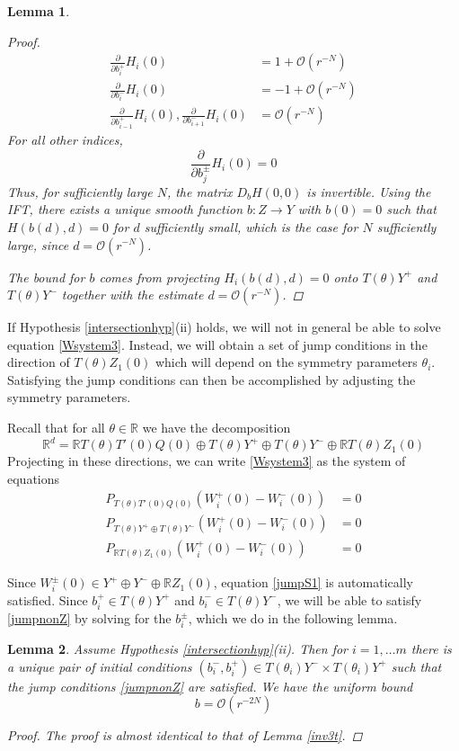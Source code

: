 \documentclass[12pt]{article}
\def\R{{\mathbb R}}
\newtheorem{lemma}{Lemma}
\begin{document}
\begin{lemma}
\begin{proof}
\begin{align*}
\frac{\partial}{\partial b_i^+}H_i(0) &= 1 + \mathcal{O}(r^{-N})  \\
\frac{\partial}{\partial b_i^-}H_i(0) &= -1 + \mathcal{O}(r^{-N}) \\
\frac{\partial}{\partial b_{i-1}^+}H_i(0),
\frac{\partial}{\partial b_{i+1}^-}H_i(0) &= \mathcal{O}(r^{-N})
\end{align*}
For all other indices,
\[
\frac{\partial}{\partial b_j^\pm}H_i(0) = 0
\]
Thus, for sufficiently large $N$, the matrix $D_b H(0,0)$ is invertible. Using the IFT, there exists a unique smooth function $b: Z \rightarrow Y$ with $b(0) = 0$ such that $H(b(d),d) = 0$ for $d$ sufficiently small, which is the case for $N$ sufficiently large, since $d = \mathcal{O}(r^{-N})$.

The bound for $b$ comes from projecting $H_i(b(d), d) = 0$ onto $T(\theta)Y^+$ and $T(\theta)Y^-$ together with the estimate $d = \mathcal{O}(r^{-N})$.
\end{proof}
\end{lemma}

If Hypothesis \ref{intersectionhyp}(ii) holds, we will not in general be able to solve equation \eqref{Wsystem3}. Instead, we will obtain a set of jump conditions in the direction of $T(\theta) Z_1(0)$ which will depend on the symmetry parameters $\theta_i$. Satisfying the jump conditions can then be accomplished by adjusting the symmetry parameters.

Recall that for all $\theta \in \R$ we have the decomposition
\[
\R^d = \R T(\theta) T'(0)Q(0) \oplus T(\theta) Y^+ \oplus T(\theta) Y^- \oplus \R T(\theta) Z_1(0)
\]
Projecting in these directions, we can write \eqref{Wsystem3} as the system of equations
\begin{align}
P_{T(\theta)T'(0)Q(0)}\left( W_i^+(0) - W_i^-(0) \right) &= 0 \label{jumpS1} \\
P_{T(\theta)Y^+ \oplus T(\theta)Y^-}\left( W_i^+(0) - W_i^-(0) \right) &= 0 \label{jumpnonZ} \\
P_{\R T(\theta)Z_1(0)} \left( W_i^+(0) - W_i^-(0) \right) &= 0 \label{jumpZ}
\end{align}

Since $W_i^\pm(0) \in Y^+ \oplus Y^- \oplus \R Z_1(0)$, equation \ref{jumpS1} is automatically satisfied. Since $b_i^+ \in T(\theta) Y^+$ and $b_i^- \in T(\theta) Y^-$, we will be able to satisfy \eqref{jumpnonZ} by solving for the $b_i^\pm$, which we do in the following lemma.

\begin{lemma}\label{inv3nt}
Assume Hypothesis \ref{intersectionhyp}(ii). Then for $i = 1, \dots m$ there is a unique pair of initial conditions $(b_i^-, b_i^+) \in T(\theta_i) Y^- \times T(\theta_i) Y^+$ such that the jump conditions \eqref{jumpnonZ} are satisfied. We have the uniform bound
\begin{equation}\label{bboundnt}
b = \mathcal{O}(r^{-2N})
\end{equation}
\begin{proof}
The proof is almost identical to that of Lemma \ref{inv3t}.
\end{proof}
\end{lemma}
\end{document}
